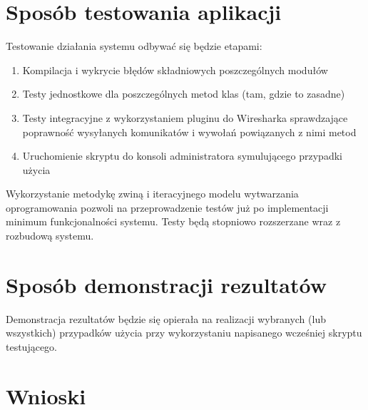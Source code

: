 \documentclass[10pt,a4paper]{article}
\begin{document}
	\section{Sposób testowania aplikacji}
		Testowanie działania systemu odbywać się będzie etapami: \\
		\begin{enumerate}
		    \item Kompilacja i wykrycie błędów składniowych poszczególnych modułów
		    \item Testy jednostkowe dla poszczególnych metod klas (tam, gdzie to zasadne)
		    \item Testy integracyjne z wykorzystaniem pluginu do Wiresharka sprawdzające poprawność wysyłanych komunikatów i wywołań powiązanych z nimi metod
		    \item Uruchomienie skryptu do konsoli administratora symulującego przypadki użycia
	    \end{enumerate}
	    
	    Wykorzystanie metodykę zwiną i iteracyjnego modelu wytwarzania oprogramowania pozwoli na przeprowadzenie testów już po implementacji minimum funkcjonalności systemu. Testy będą stopniowo rozszerzane wraz z rozbudową systemu.

	\section{Sposób  demonstracji rezultatów}
		Demonstracja rezultatów będzie się opierała na realizacji wybranych (lub wszystkich) przypadków użycia przy wykorzystaniu napisanego wcześniej skryptu testującego.
		
	\section{Wnioski}
\end{document}
